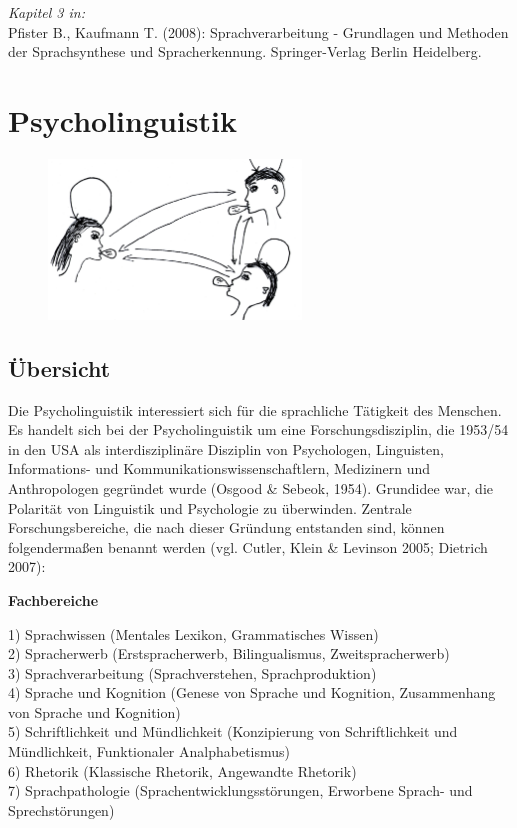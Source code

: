 \documentclass[11pt]{book}
\begin{document}
\emph{Kapitel 3 in:}\\
Pfister B., Kaufmann T. (2008): Sprachverarbeitung - Grundlagen und 
	Methoden der Sprachsynthese und Spracherkennung. 
	Springer-Verlag Berlin Heidelberg.


\renewcommand\refname{\vskip -1cm}
{}










\chapter{Psycholinguistik}
\begin{figure}[htbp]
\begin{center}
\includegraphics[width=0.6\textwidth]{grafiken/psycholinguistik/psycholinguistik}
\label{t9}
\end{center}
\end{figure}
\section{Übersicht}
Die Psycholinguistik interessiert sich für die sprachliche Tätigkeit des Menschen. Es handelt sich bei der Psycholinguistik um eine Forschungsdisziplin, die 1953/54 in den USA als interdisziplinäre Disziplin von Psychologen, Linguisten, Informations- und Kommunikationswissenschaftlern, Medizinern und Anthropologen gegründet wurde (Osgood \& Sebeok, 1954). Grundidee war, die Polarität von Linguistik und Psychologie zu überwinden. Zentrale Forschungsbereiche, die nach dieser Gründung entstanden sind, können folgendermaßen benannt werden (vgl. Cutler, Klein \& Levinson 2005; Dietrich 2007):

\textbf{Fachbereiche}

1)	Sprachwissen (Mentales Lexikon, Grammatisches Wissen)\\
2)	Spracherwerb (Erstspracherwerb, Bilingualismus, Zweitspracherwerb)\\
3)	Sprachverarbeitung (Sprachverstehen, Sprachproduktion)\\
4)	Sprache und Kognition (Genese von Sprache und Kognition, Zusammenhang von Sprache und Kognition)\\
5)	 Schriftlichkeit und Mündlichkeit (Konzipierung von Schriftlichkeit und Mündlichkeit, Funktionaler Analphabetismus)\\
6)	Rhetorik (Klassische Rhetorik, Angewandte Rhetorik)\\
7)	Sprachpathologie (Sprachentwicklungsstörungen, Erworbene Sprach- und Sprechstörungen)\\
\end{document}
